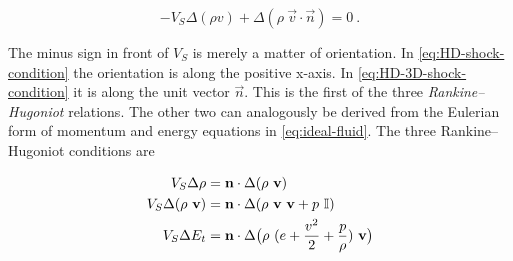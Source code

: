 \begin{equation}
\label{eq:HD-3D-shock-condition}
- V_S \Delta(\rho v) + \Delta(\rho \ \vec{v} \cdot \vec{n}) = 0 \ .
\end{equation}

The minus sign in front of $V_S$ is merely a matter of orientation. In \cref{eq:HD-shock-condition} the orientation is along the positive x-axis. In \cref{eq:HD-3D-shock-condition} it is along the unit vector $\vec{n}$. This is the first of the three \textit{Rankine–Hugoniot} relations. The other two can analogously be derived from the Eulerian form of momentum and energy equations in \cref{eq:ideal-fluid}. The three Rankine–Hugoniot conditions are

\begin{equation}
\label{HD-shock-conditions}
\begin{split}
V_S \Delta \rho &= \vec{n}\cdot\Delta(\rho \ \vec{v})\\
V_S \Delta (\rho \ \vec{v}) &= \vec{n} \cdot \Delta(\rho \ \vec{v} \ \vec{v} + p \ \I) \\
V_S \Delta E_t &= \vec{n} \cdot \Delta \big (\rho \ (e + \frac{v^2}{2} + \frac{p}{\rho}) \ \vec{v} \big)
\end{split}
\end{equation}









